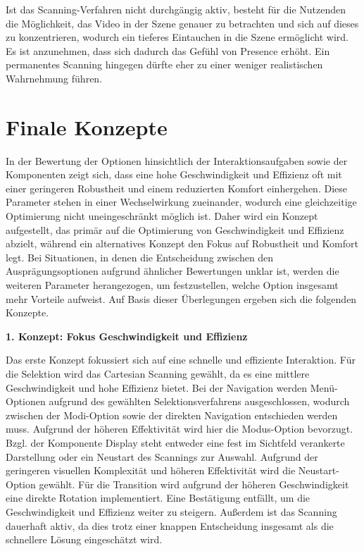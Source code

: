 Ist das Scanning-Verfahren nicht durchgängig aktiv, besteht für die Nutzenden die Möglichkeit, das Video in der Szene genauer zu betrachten und sich auf dieses zu konzentrieren, wodurch ein tieferes Eintauchen in die Szene ermöglicht wird. Es ist anzunehmen, dass sich dadurch das Gefühl von Presence erhöht. Ein permanentes Scanning hingegen dürfte eher zu einer weniger realistischen Wahrnehmung führen. 

\section{Finale Konzepte}

In der Bewertung der Optionen hinsichtlich der Interaktionsaufgaben sowie der Komponenten zeigt sich, dass eine hohe Geschwindigkeit und Effizienz oft mit einer geringeren Robustheit und einem reduzierten Komfort einhergehen. Diese Parameter stehen in einer Wechselwirkung zueinander, wodurch eine gleichzeitige Optimierung nicht uneingeschränkt möglich ist. Daher wird ein Konzept aufgestellt, das primär auf die Optimierung von Geschwindigkeit und Effizienz abzielt, während ein alternatives Konzept den Fokus auf Robustheit und Komfort legt. Bei Situationen, in denen die Entscheidung zwischen den Ausprägungsoptionen aufgrund ähnlicher Bewertungen unklar ist, werden die weiteren Parameter herangezogen, um festzustellen, welche Option insgesamt mehr Vorteile aufweist. Auf Basis dieser Überlegungen ergeben sich die folgenden Konzepte.

{\normalfont \bfseries 1. Konzept: Fokus Geschwindigkeit und Effizienz} 

Das erste Konzept fokussiert sich auf eine schnelle und effiziente Interaktion. Für die Selektion wird das Cartesian Scanning gewählt, da es eine mittlere Geschwindigkeit und hohe Effizienz bietet. Bei der Navigation werden Menü-Optionen aufgrund des gewählten Selektionsverfahrens ausgeschlossen, wodurch zwischen der Modi-Option sowie der direkten Navigation entschieden werden muss. Aufgrund der höheren Effektivität wird hier die Modus-Option bevorzugt. Bzgl. der Komponente Display steht entweder eine fest im Sichtfeld verankerte Darstellung oder ein Neustart des Scannings zur Auswahl. Aufgrund der geringeren visuellen Komplexität und höheren Effektivität wird die Neustart-Option gewählt. Für die Transition wird aufgrund der höheren Geschwindigkeit eine direkte Rotation implementiert. Eine Bestätigung entfällt, um die Geschwindigkeit und Effizienz weiter zu steigern. Außerdem ist das Scanning dauerhaft aktiv, da dies trotz einer knappen Entscheidung insgesamt als die schnellere Lösung eingeschätzt wird. 


